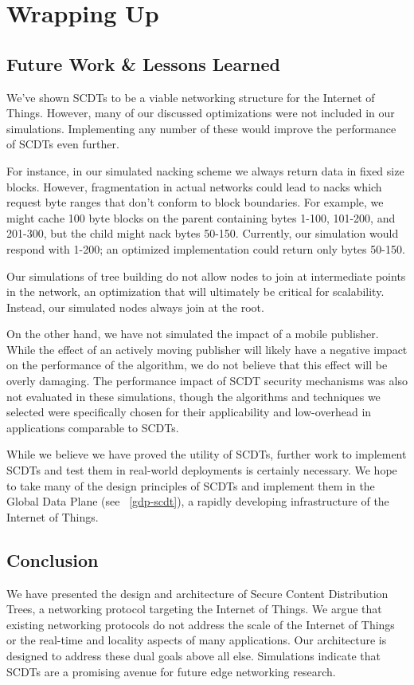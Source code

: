\chapter{Wrapping Up}

\section{Future Work \& Lessons Learned}
We've shown SCDTs to be a viable networking structure for the Internet of Things. However, many of our discussed optimizations were not included in our simulations. Implementing any number of these would improve the performance of SCDTs even further. 

For instance, in our simulated nacking scheme we always return data in fixed size blocks. However, fragmentation in actual networks could lead to nacks which request byte ranges that don't conform to block boundaries. For example, we might cache 100 byte blocks on the parent containing bytes 1-100, 101-200, and 201-300, but the child might nack bytes 50-150.  Currently, our simulation would respond with 1-200; an optimized implementation could return only bytes 50-150.

Our simulations of tree building do not allow nodes to join at intermediate points in the network, an optimization that will ultimately be critical for scalability. Instead, our simulated nodes always join at the root.

On the other hand, we have not simulated the impact of a mobile publisher. While the effect of an actively moving publisher will likely have a negative impact on the performance of the algorithm, we do not believe that this effect will be overly damaging. The performance impact of SCDT security mechanisms was also not evaluated in these simulations, though the algorithms and techniques we selected were specifically chosen for their applicability and low-overhead in applications comparable to SCDTs.

While we believe we have proved the utility of SCDTs, further work to implement SCDTs and test them in real-world deployments is certainly necessary. We hope to take many of the design principles of SCDTs and implement them in the Global Data Plane (see ~\autoref{gdp-scdt}), a rapidly developing infrastructure of the Internet of Things.

\section{Conclusion}
We have presented the design and architecture of Secure Content Distribution Trees, a networking protocol targeting the Internet of Things. We argue that existing networking protocols do not address the scale of the Internet of Things or the real-time and locality aspects of many applications. Our architecture is designed to address these dual goals above all else. Simulations indicate that SCDTs are a promising avenue for future edge networking research.

